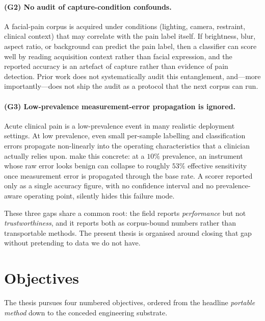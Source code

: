 \paragraph{(G2) No audit of capture-condition confounds.}
A facial-pain corpus is acquired under conditions (lighting, camera, restraint,
clinical context) that may correlate with the pain label itself. If brightness,
blur, aspect ratio, or background can predict the pain label, then a classifier
can score well by reading acquisition context rather than facial expression, and
the reported accuracy is an artefact of capture rather than evidence of pain
detection. Prior work does not systematically audit this entanglement, and---more
importantly---does not ship the audit as a protocol that the next corpus can run.

\paragraph{(G3) Low-prevalence measurement-error propagation is ignored.}
Acute clinical pain is a low-prevalence event in many realistic deployment
settings. At low prevalence, even small per-sample labelling and classification
errors propagate non-linearly into the operating characteristics that a clinician
actually relies upon. \textcite{chavoshi2025} make this concrete: at a $10\%$
prevalence, an instrument whose raw error looks benign can collapse to roughly
$53\%$ effective sensitivity once measurement error is propagated through the base
rate. A scorer reported only as a single accuracy figure, with no confidence
interval and no prevalence-aware operating point, silently hides this failure
mode.

These three gaps share a common root: the field reports \emph{performance} but not
\emph{trustworthiness}, and it reports both as corpus-bound numbers rather than
transportable methods. The present thesis is organised around closing that gap
without pretending to data we do not have.

\section{Objectives}
\label{sec:intro-objectives}

The thesis pursues four numbered objectives, ordered from the headline
\emph{portable method} down to the conceded engineering substrate.

